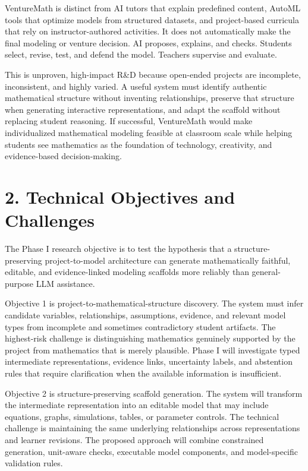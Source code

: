 VentureMath is distinct from AI tutors that explain predefined content, AutoML tools that optimize models from structured datasets, and project-based curricula that rely on instructor-authored activities. It does not automatically make the final modeling or venture decision. AI proposes, explains, and checks. Students select, revise, test, and defend the model. Teachers supervise and evaluate.

This is unproven, high-impact R\&D because open-ended projects are incomplete, inconsistent, and highly varied. A useful system must identify authentic mathematical structure without inventing relationships, preserve that structure when generating interactive representations, and adapt the scaffold without replacing student reasoning. If successful, VentureMath would make individualized mathematical modeling feasible at classroom scale while helping students see mathematics as the foundation of technology, creativity, and evidence-based decision-making.

\section{2. Technical Objectives and Challenges}

The Phase I research objective is to test the hypothesis that a structure-preserving project-to-model architecture can generate mathematically faithful, editable, and evidence-linked modeling scaffolds more reliably than general-purpose LLM assistance.

Objective 1 is project-to-mathematical-structure discovery. The system must infer candidate variables, relationships, assumptions, evidence, and relevant model types from incomplete and sometimes contradictory student artifacts. The highest-risk challenge is distinguishing mathematics genuinely supported by the project from mathematics that is merely plausible. Phase I will investigate typed intermediate representations, evidence links, uncertainty labels, and abstention rules that require clarification when the available information is insufficient.

Objective 2 is structure-preserving scaffold generation. The system will transform the intermediate representation into an editable model that may include equations, graphs, simulations, tables, or parameter controls. The technical challenge is maintaining the same underlying relationships across representations and learner revisions. The proposed approach will combine constrained generation, unit-aware checks, executable model components, and model-specific validation rules.

